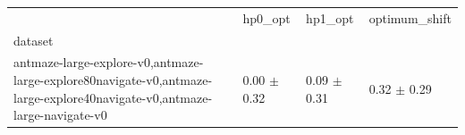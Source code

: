 \begin{tabular}{llll}
\toprule
 & hp0_opt & hp1_opt & optimum_shift \\
dataset &  &  &  \\
\midrule
antmaze-large-explore-v0,antmaze-large-explore80navigate-v0,antmaze-large-explore40navigate-v0,antmaze-large-navigate-v0 & 0.00 $\pm$ 0.32 & 0.09 $\pm$ 0.31 & 0.32 $\pm$ 0.29 \\
\bottomrule
\end{tabular}
